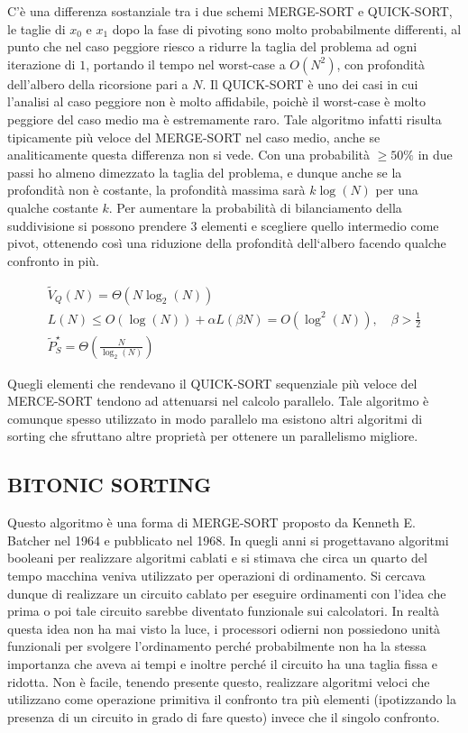 \documentclass[a4paper,portrait,12pt]{article}
\theoremstyle{definition}
\begin{document}
C’è una differenza sostanziale tra i due schemi MERGE-SORT e QUICK-SORT, le taglie di $x_0$ e $x_1$ dopo la fase di pivoting sono molto probabilmente differenti, al punto che nel caso peggiore riesco a ridurre la taglia del problema ad ogni iterazione di $1$, portando il tempo nel worst-case a $O(N^2)$, con profondità dell’albero della ricorsione pari a $N$.
Il QUICK-SORT è uno dei casi in cui l’analisi al caso peggiore non è molto affidabile, poichè il worst-case è molto peggiore del caso medio ma è estremamente raro.
Tale algoritmo infatti risulta tipicamente più veloce del MERGE-SORT nel caso medio, anche se analiticamente questa differenza non si vede.
Con una probabilità $\ge 50\%$ in due passi ho almeno dimezzato la taglia del problema, e dunque anche se la profondità non è costante, la profondità massima sarà $k \log(N)$ per una qualche costante $k$.
Per aumentare la probabilità di bilanciamento della suddivisione si possono prendere $3$ elementi e scegliere quello intermedio come pivot, ottenendo così una riduzione della profondità dell‘albero facendo qualche confronto in più.

\begin{gather*}
\tilde{V}_Q(N) = \Theta(N \log_2(N))\\
L(N) \le O(\log(N)) + \alpha L(\beta N) = O(\log^2(N)),\quad \beta > \frac{1}{2}\\
\tilde{P}_S^{\star} = \Theta(\frac{N}{\log_2(N)})
\end{gather*}

Quegli elementi che rendevano il QUICK-SORT sequenziale più veloce del MERCE-SORT tendono ad attenuarsi nel calcolo parallelo.
Tale algoritmo è comunque spesso utilizzato in modo parallelo ma esistono altri algoritmi di sorting che sfruttano altre proprietà per ottenere un parallelismo migliore.


\subsection{BITONIC SORTING}

Questo algoritmo è una forma di MERGE-SORT proposto da Kenneth E. Batcher nel 1964 e pubblicato nel 1968.
In quegli anni si progettavano algoritmi booleani per realizzare algoritmi cablati e si stimava che circa un quarto del tempo macchina veniva utilizzato per operazioni di ordinamento.
Si cercava dunque di realizzare un circuito cablato per eseguire ordinamenti con l’idea che prima o poi tale circuito sarebbe diventato funzionale sui calcolatori.
In realtà questa idea non ha mai visto la luce, i
processori odierni non possiedono unità funzionali per svolgere l’ordinamento perché probabilmente non ha la stessa importanza che aveva ai tempi e inoltre perché il circuito ha una taglia fissa e ridotta.
Non è facile, tenendo presente questo, realizzare algoritmi veloci che utilizzano come operazione primitiva il confronto tra più elementi (ipotizzando la presenza di un circuito in grado di fare questo) invece che il singolo confronto.\\
\end{document}
